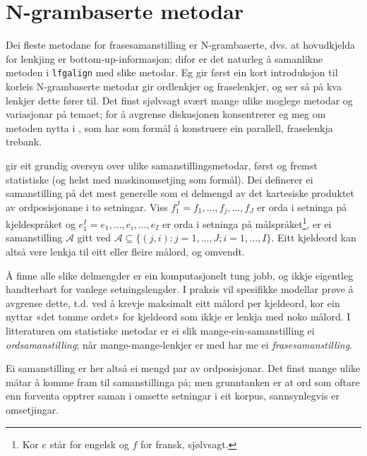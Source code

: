 \documentclass[12pt,a4paper,oneside,draft]{report}
\begin{document}
\section{N-grambaserte metodar}
\label{sec-5.2}


Dei fleste metodane for frasesamanstilling er N-grambaserte, dvs. at
 hovudkjelda for lenkjing er bottom-up-informasjon; difor er det
 naturleg å samanlikne metoden i \texttt{lfgalign} med slike metodar. Eg gir
 først ein kort introduksjon til korleis N-grambaserte metodar gir
 ordlenkjer og fraselenkjer, og ser så på kva lenkjer dette fører
 til. Det finst sjølvsagt svært mange ulike moglege metodar og
 variasjonar på temaet; for å avgrense diskusjonen konsentrerer eg meg
 om metoden nytta i \citet{samuelsson2007apa}, som har som formål å
 konstruere ein parallell, fraselenkja trebank.

\citet[s.~20--21]{och2003scv} gir eit grundig oversyn over ulike
 samanstillingsmetodar, først og fremst statistiske (og helst med
 maskinomsetjing som formål). Dei definerer ei samanstilling på det
 mest generelle som ei delmengd av det kartesiske produktet av
 ordposisjonane i to setningar. Viss $f_{1}^{J}=f_1,...,f_j,...,f_J$
 er orda i setninga på kjeldespråket og
 $e_{1}^{I}=e_1,...,e_i,...,e_I$ er orda i setninga på
 målspråket\footnote{Kor $e$ står for engelsk og $f$ for fransk, sjølvsagt. }, er ei samanstilling $\mathcal{A}$ gitt ved
 $\mathcal{A}\subseteq \{(j,i): j=1,...,J;i=1,...,I\}$. Eitt kjeldeord
 kan altså vere lenkja til eitt eller fleire målord, og omvendt.

Å finne alle slike delmengder er ein komputasjonelt tung jobb, og
 ikkje eigentleg handterbart for vanlege setningslengder.  I praksis
 vil spesifikke modellar prøve å avgrense dette, t.d. ved å krevje
 maksimalt eitt målord per kjeldeord, kor ein nyttar «det tomme ordet»
 for kjeldeord som ikkje er lenkja med noko målord. I litteraturen om
 statistiske metodar er ei slik mange-ein-samanstilling ei
 \emph{ordsamanstilling}; når mange-mange-lenkjer er med har me ei
 \emph{frasesamanstilling}.

Ei samanstilling er her altså ei mengd par av ordposisjonar. Det
 finst mange ulike måtar å komme fram til samanstillinga på; men
 grunntanken er at ord som oftare enn forventa opptrer saman i omsette
 setningar i eit korpus, sannsynlegvis er omsetjingar.
\end{document}
